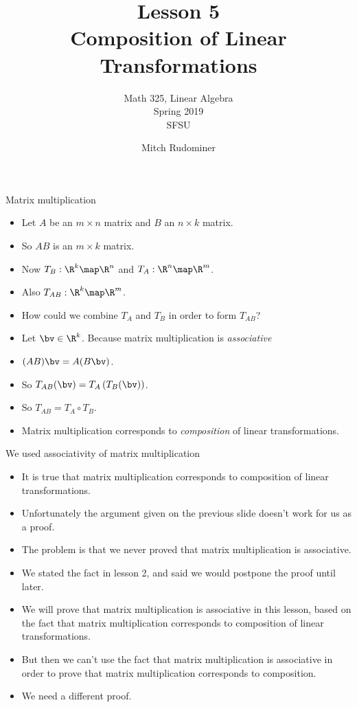 \documentclass{beamer}
\title{Lesson 5 \\ Composition of Linear Transformations}
\subtitle{Math 325, Linear Algebra \\ Spring 2019 \\ SFSU}
\author{Mitch Rudominer}
\date{}
\begin{document}
\begin{frame}
  \titlepage
\end{frame}


\begin{frame}{Matrix multiplication}

\begin{itemize}
\item Let $A$ be an $m\times n$ matrix and $B$ an $n\times k$ matrix.
\item So $A B$ is an $m\times k$ matrix.
\item Now $T_B:\R^k\map\R^n$ and $T_A:\R^n\map\R^m$.
\item Also $T_{AB}:\R^k\map\R^m$.
\item How could we combine $T_A$ and $T_B$ in order to form $T_{AB}$?
\item Let $\bv\in\R^k$. Because matrix multiplication is \emph{associative}
\item $(A B) \bv = A (B \bv)$.
\item So $T_{AB}(\bv) = T_A\left( T_B(\bv) \right)$.
\item So $T_{AB} = T_A \circ T_B$.
\item Matrix multiplication corresponds to \emph{composition} of linear transformations.
\end{itemize}
\end{frame}

\begin{frame}{We used associativity of matrix multiplication}

\begin{itemize}
\item It is true that matrix multiplication corresponds to composition of linear transformations.
\item Unfortunately the argument given on the previous slide doesn't work for us as a proof.
\item The problem is that we never proved that matrix multiplication is associative.
\item We stated the fact in lesson 2, and said we would postpone the proof until later.
\item We will prove that matrix multiplication is associative in this lesson, based on
the fact that matrix multiplication corresponds to composition of linear transformations.
\item But then we can't use the fact that matrix multiplication is associative in order
to prove that matrix multiplication corresponds to composition.
\item We need a different proof.
\end{itemize}

\end{frame}
\end{document}
